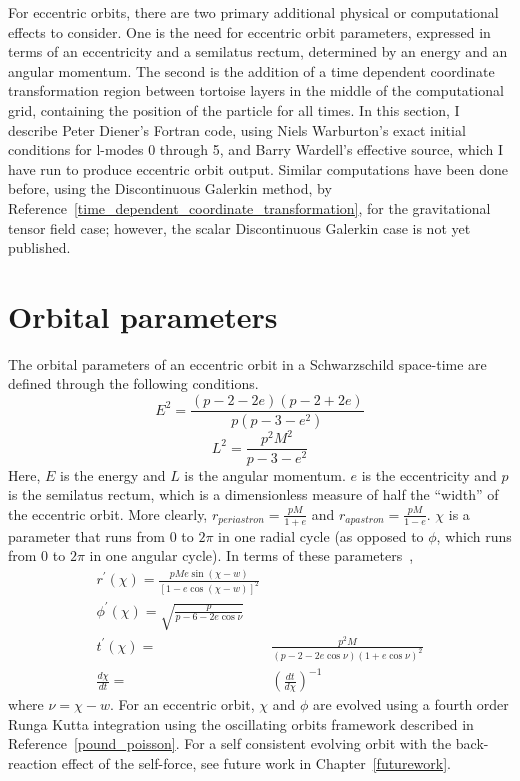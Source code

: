 For eccentric orbits, there are two primary additional physical or computational effects to consider. One is the need for eccentric orbit parameters, expressed in terms of an eccentricity and a semilatus rectum, determined by an energy and an angular momentum. The second is the addition of a time dependent coordinate transformation region between tortoise layers in the middle of the computational grid, containing the position of the particle for all times. In this section, I describe Peter Diener's Fortran code, using Niels Warburton's exact initial conditions for l-modes 0 through 5, and Barry Wardell's effective source, which I have run to produce eccentric orbit output. Similar computations have been done before, using the Discontinuous Galerkin method, by Reference~\ref{time_dependent_coordinate_transformation}, for the gravitational tensor field case; however, the scalar Discontinuous Galerkin case is not yet published.

\section{Orbital parameters}

The orbital parameters of an eccentric orbit in a Schwarzschild space-time are defined through the following conditions.
\begin{equation}
  E^2=\frac{(p-2-2e)(p-2+2e)}{p(p-3-e^2)}
\end{equation}
\begin{equation}
  L^2=\frac{p^2M^2}{p-3-e^2}
\end{equation}
Here, $E$ is the energy and $L$ is the angular momentum. $e$ is the eccentricity and $p$ is the semilatus rectum, which is a dimensionless measure of half the ``width'' of the eccentric orbit. More clearly, $r_{periastron}=\frac{pM}{1+e}$ and $r_{apastron}=\frac{pM}{1-e}$. $\chi$ is a parameter that runs from $0$ to $2\pi$ in one radial cycle (as opposed to $\phi$, which runs from $0$ to $2\pi$ in one angular cycle). In terms of these parameters~\cite{pound_poisson},
\begin{eqnarray}
  r^\prime(\chi)=\frac{pMe\sin(\chi-w)}{[1-e\cos(\chi-w)]^2}\\
  \phi^\prime(\chi)=\sqrt{\frac{p}{p-6-2e\cos\nu}}\\
  t^\prime(\chi)=&\frac{p^2M}{(p-2-2e\cos\nu)(1+e\cos\nu)^2}\nonumber\\
  \frac{d\chi}{dt}=&(\frac{dt}{d\chi})^{-1}
\end{eqnarray}
where $\nu=\chi-w$. For an eccentric orbit, $\chi$ and $\phi$ are evolved using a fourth order Runga Kutta integration using the oscillating orbits framework described in Reference~\ref{pound_poisson}. For a self consistent evolving orbit with the back-reaction effect of the self-force, see future work in Chapter~\ref{futurework}. 


